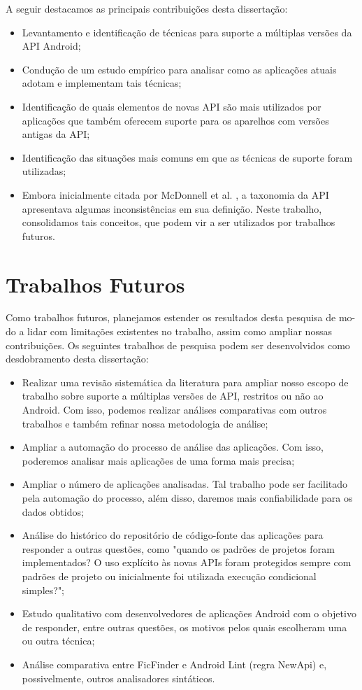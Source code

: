 A seguir destacamos as principais contribuições desta dissertação:
\begin{itemize}
	\item Levantamento e identificação de técnicas para suporte a múltiplas versões
		da API Android;
	\item Condução de um estudo empírico para analisar como as aplicações atuais
		adotam e implementam tais técnicas;
	\item Identificação de quais elementos de novas API são mais utilizados por
		aplicações que também oferecem suporte para os aparelhos com versões antigas
		da API;
	\item Identificação das situações mais comuns em que as técnicas de suporte
		foram utilizadas;
	\item Embora inicialmente citada por McDonnell et al. \cite{McDonnell2013},
		a taxonomia da API apresentava algumas inconsistências em sua definição.
		Neste trabalho, consolidamos tais conceitos, que podem vir a ser utilizados
		por trabalhos futuros.
\end{itemize}

\section{Trabalhos Futuros}\label{sec:trabalhos_futuros}

Como trabalhos futuros, planejamos estender os resultados desta pesquisa
de mo- do a lidar com limitações existentes no trabalho, assim como ampliar 
nossas contribuições. Os seguintes trabalhos de pesquisa podem ser desenvolvidos
como desdobramento desta dissertação:

\begin{itemize}
	\item Realizar uma revisão sistemática da literatura para ampliar nosso
		escopo de trabalho sobre suporte a múltiplas versões de API, restritos
		ou não ao Android. Com isso, podemos realizar análises comparativas com
		outros trabalhos e também refinar nossa metodologia de análise;
	\item Ampliar a automação do processo de análise das aplicações. Com isso,
		poderemos analisar mais aplicações de uma forma mais precisa;
	\item Ampliar o número de aplicações analisadas. Tal trabalho pode ser facilitado
		pela automação do processo, além disso, daremos mais confiabilidade para os
		dados obtidos;
	\item Análise do histórico do repositório de código-fonte das aplicações para
		responder a outras questões, como "quando os padrões de projetos foram
		implementados? O uso explícito às novas APIs foram protegidos sempre com
		padrões de projeto ou inicialmente foi utilizada execução condicional simples?"; 
	\item Estudo qualitativo com desenvolvedores de aplicações Android com o objetivo
		de responder, entre outras questões, os motivos pelos quais escolheram uma ou
		outra técnica;
	\item Análise comparativa entre FicFinder e Android Lint (regra NewApi) e,
		possivelmente, outros analisadores sintáticos.
\end{itemize}
